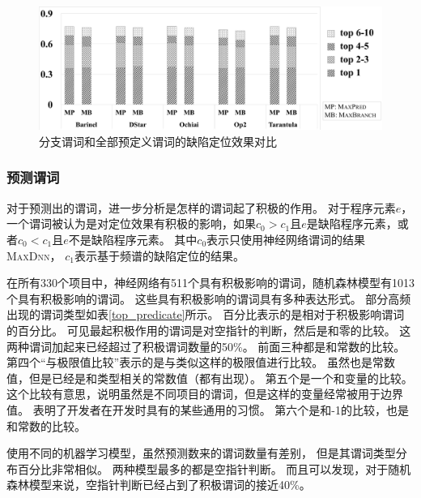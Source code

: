 \begin{figure}[htbp] 
\centering 
\includegraphics[width=16cm]{figure/branch-compare} 
\caption{分支谓词和全部预定义谓词的缺陷定位效果对比} 
\label{fig:branch-compare}
\end{figure}

\subsubsection{预测谓词}
\label{sec:eval_pref_predict}

对于预测出的谓词，进一步分析是怎样的谓词起了积极的作用。
对于程序元素$e$，
一个谓词被认为是对定位效果有积极的影响，如果$c_0 > c_1$且$e$是缺陷程序元素，或者$c_0 < c_1$且$e$不是缺陷程序元素。
其中$c_0$表示只使用神经网络谓词的结果\textsc{MaxDnn}，
$c_1$表示基于频谱的缺陷定位的结果。

在所有330个项目中，神经网络有511个具有积极影响的谓词，随机森林模型有1013个具有积极影响的谓词。
这些具有积极影响的谓词具有多种表达形式。
部分高频出现的谓词类型如表\ref{top_predicate}所示。
百分比表示的是相对于积极影响谓词的百分比。
可见最起积极作用的谓词是对空指针的判断，然后是和零的比较。
这两种谓词加起来已经超过了积极谓词数量的50\%。
前面三种都是和常数的比较。
第四个“与极限值比较”表示的是与类似这样的极限值进行比较。
虽然也是常数值，但是已经是和类型相关的常数值（都有出现）。
第五个是一个和变量的比较。
这个比较有意思，说明虽然是不同项目的谓词，但是这样的变量经常被用于边界值。
表明了开发者在开发时具有的某些通用的习惯。
第六个是和-1的比较，也是和常数的比较。

使用不同的机器学习模型，虽然预测数来的谓词数量有差别，
但是其谓词类型分布百分比非常相似。
两种模型最多的都是空指针判断。
而且可以发现，对于随机森林模型来说，空指针判断已经占到了积极谓词的接近40\%。

